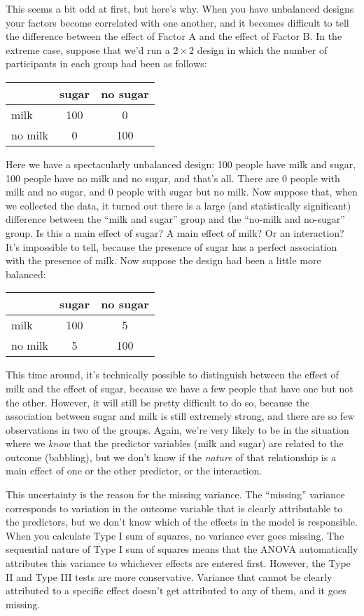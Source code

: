 This seems a bit odd at first, but here's why. When you have unbalanced designs your factors become correlated with one another, and it becomes difficult to tell the difference between the effect of Factor A and the effect of Factor B. In the extreme case, suppose that we'd run a $2 \times 2$ design in which the number of participants in each group had been as follows:
\begin{center}
\begin{tabular}{l|cc}
& sugar & no sugar \\ \hline
milk & 100 & 0 \\
no milk & 0& 100 \\
\end{tabular}
\end{center}
Here we have a spectacularly unbalanced design: 100 people have milk and sugar, 100 people have no milk and no sugar, and that's all. There are 0 people with milk and no sugar, and 0 people with sugar but no milk. Now suppose that, when we collected the data, it turned out there is a large (and statistically significant) difference between the ``milk and sugar'' group and the ``no-milk and no-sugar'' group. Is this a main effect of sugar? A main effect of milk? Or an interaction? It's impossible to tell, because the presence of sugar has a perfect association with the presence of milk. Now suppose the design had been a little more balanced:
\begin{center}
\begin{tabular}{l|cc}
& sugar & no sugar \\ \hline
milk & 100 & 5 \\
no milk & 5 & 100 \\
\end{tabular}
\end{center}
This time around, it's technically possible to distinguish between the effect of milk and the effect of sugar, because we have a few people that have one but not the other. However, it will still be pretty difficult to do so, because the association between sugar and milk is still extremely strong, and there are so few observations in two of the groups. Again, we're very likely to be in the situation where we {\it know} that the predictor variables (milk and sugar) are related to the outcome (babbling), but we don't know if the {\it nature} of that relationship is a main effect of one or the other predictor, or the interaction. 

This uncertainty is the reason for the missing variance. The ``missing'' variance corresponds to variation in the outcome variable that is clearly attributable to the predictors, but we don't know which of the effects in the model is responsible. When you calculate Type I sum of squares, no variance ever goes missing. The sequential nature of Type I sum of squares means that the ANOVA automatically attributes this variance to whichever effects are entered first. However, the Type II and Type III tests are more conservative. Variance that cannot be clearly attributed to a specific effect doesn't get attributed to any of them, and it goes missing. 


